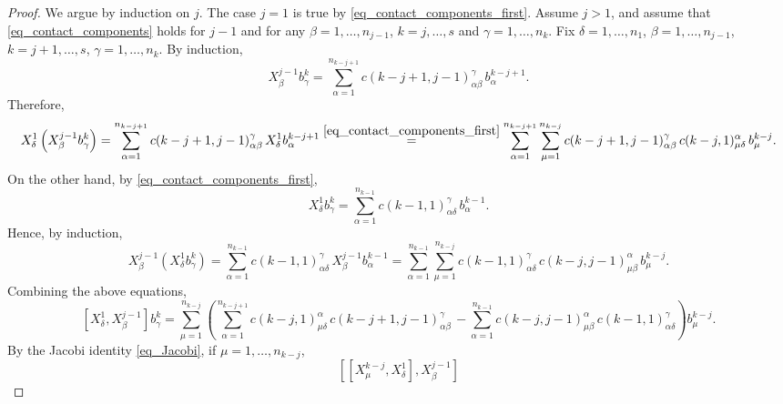 \documentclass[11pt]{amsart}
\theoremstyle{plain}
\theoremstyle{definition}
\theoremstyle{remark}
\numberwithin{equation}{section}
\begin{document}
\begin{proof}
We argue by induction on $j$. The case $j=1$ is true by \eqref{eq_contact_components_first}. Assume $j>1$, and assume that \eqref{eq_contact_components} holds for $j-1$ and for any $\beta=1,\dots,n_{j-1}$, $k=j,\dots,s$ and $\gamma=1,\dots,n_k$.
Fix $\delta=1,\dots,n_1$, $
\beta=1,\dots,n_{j-1}$, $
k=j+1,\dots,s$, 
$
\gamma=1,\dots,n_k$.
By induction,
\begin{equation*}
X^{j-1}_\beta b^k_\gamma
=
\sum_{\alpha=1}^{n_{k-j+1}}
c(k-j+1,j-1)^\gamma_{\alpha\beta} \,
b^{k-j+1}_\alpha.
\end{equation*}
Therefore,
\begin{equation*}
X^1_\delta\left(X^{j-1}_\beta b^k_\gamma\right)
=
\sum_{\alpha=1}^{n_{k-j+1}}
c(k-j+1,j-1)^\gamma_{\alpha\beta} \,
X^1_\delta b^{k-j+1}_\alpha
\overset{\eqref{eq_contact_components_first}}{=}
\sum_{\alpha=1}^{n_{k-j+1}}
\sum_{\mu=1}^{n_{k-j}}
c(k-j+1,j-1)^\gamma_{\alpha\beta} \,
c(k-j,1)^\alpha_{\mu\delta} \,
b^{k-j}_\mu.
\end{equation*}
On the other hand, by \eqref{eq_contact_components_first},
\begin{equation*}
X^1_\delta b^k_\gamma
=
\sum_{\alpha=1}^{n_{k-1}}
c(k-1,1)^\gamma_{\alpha\delta} \,
b^{k-1}_\alpha.
\end{equation*}
Hence, by induction,
\begin{equation*}
X^{j-1}_\beta\left(X^1_\delta b^k_\gamma\right)
=
\sum_{\alpha=1}^{n_{k-1}}
c(k-1,1)^\gamma_{\alpha\delta} \,
X^{j-1}_\beta b^{k-1}_\alpha
=
\sum_{\alpha=1}^{n_{k-1}}
\sum_{\mu=1}^{n_{k-j}}
c(k-1,1)^\gamma_{\alpha\delta} \,
c(k-j,j-1)^\alpha_{\mu\beta} \,
b^{k-j}_\mu.
\end{equation*}
Combining the above equations,
\begin{equation*}
\left[X^1_\delta,X^{j-1}_\beta\right]b^k_\gamma
=
\sum_{\mu=1}^{n_{k-j}}
\left(
\sum_{\alpha=1}^{n_{k-j+1}}
c(k-j,1)^\alpha_{\mu\delta} \,
c(k-j+1,j-1)^\gamma_{\alpha\beta} \,
-
\sum_{\alpha=1}^{n_{k-1}}
c(k-j,j-1)^\alpha_{\mu\beta} \,
c(k-1,1)^\gamma_{\alpha\delta}
\right)b^{k-j}_\mu.
\end{equation*}
By the Jacobi identity \eqref{eq_Jacobi}, if $\mu=1,\ldots,n_{k-j}$,
\begin{equation*}
\left[\left[X^{k-j}_\mu,X^1_\delta\right],X^{j-1}_\beta\right]

\end{equation*}
\end{proof}
\end{document}
